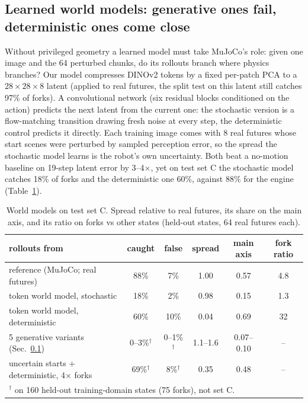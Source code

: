 \documentclass{article}
\begin{document}
\subsection{Learned world models: generative ones fail, deterministic ones come close}\label{sec:wm}
Without privileged geometry a learned model must take MuJoCo's role:
given one image and the 64 perturbed chunks, do its rollouts branch where physics branches? Our
model compresses DINOv2 tokens by a fixed per-patch PCA to a $28\times28\times8$ latent (applied to real
futures, the split test on this latent still catches 97\% of forks). A convolutional network (six residual
blocks conditioned on the action) predicts the next latent from the current one: the stochastic version
is a flow-matching transition drawing fresh noise at every step, the deterministic control predicts it
directly. Each training image comes with 8 real futures whose start scenes were perturbed by sampled
perception error, so the spread the stochastic model learns is the robot's own uncertainty. Both beat a no-motion baseline on 19-step latent error by 3--4$\times$, yet
on test set C the stochastic model catches 18\% of forks and the deterministic one 60\%, against 88\% for
the engine (Table~\ref{tab:wm}).

\begin{table}[t]
\centering
\caption{World models on test set C. Spread relative to real futures, its share on the main axis, and its ratio on forks vs other states (held-out states, 64 real futures each).}
\label{tab:wm}
\small
\begin{tabular}{lccccc}
\toprule
rollouts from & caught & false & spread & main axis & fork ratio \\
\midrule
reference (MuJoCo; real futures) & 88\% & 7\% & 1.00 & 0.57 & 4.8 \\
token world model, stochastic & 18\% & 2\% & 0.98 & 0.15 & 1.3 \\
token world model, deterministic & 60\% & 10\% & 0.04 & 0.69 & 32 \\
5 generative variants (Sec.~\ref{sec:wm}) & 0--3\%$^\dagger$ & 0--1\%$^\dagger$ & 1.1--1.6 & 0.07--0.10 & -- \\
uncertain starts + deterministic, 4$\times$ forks & 69\%$^\dagger$ & 8\%$^\dagger$ & 0.35 & 0.48 & -- \\
\bottomrule
\multicolumn{6}{l}{\footnotesize $^\dagger$ on 160 held-out training-domain states (75 forks), not set C.}
\end{tabular}
\end{table}
\end{document}
